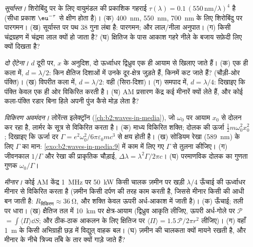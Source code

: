 \begin{exercise}[$\star\star$]\label{exo:b2:dipole-radiation:8}
\emph{सूर्यास्त।} शिरोबिंदु पर  के लिए वायुमंडल की
प्रकाशिक गहराई $\tau(\lambda) = 0.1\,(550\,\text{nm}/\lambda)^4$ है (सीधा
प्रकाश $\eu^{-\tau}$ से क्षीण होता है)। (क) \qty{400}{nm}, \qty{550}{nm}, \qty{700}{nm} के लिए
शिरोबिंदु पर पारगमन। (ख) सूर्यास्त पर पथ
$38$ गुना लंबा है: पारगमन; और लाल/नीला अनुपात। (ग) किसी चंद्रग्रहण में
चंद्रमा लाल क्यों हो जाता है? (घ) क्षितिज के पास आकाश गहरे नीले
के बजाय सफ़ेदी लिए क्यों दिखता है?
\end{exercise}

\begin{exercise}[$\star\star$]\label{exo:b2:dipole-radiation:9}
\emph{दो ऐंटेना।} $d$ दूरी पर, $x$ के अनुदिश, दो ऊर्ध्वाधर
द्विध्रुव एक ही आयाम से खिलाए जाते हैं। (क) एक ही कला में, $d = \lambda/2$: किन
क्षैतिज दिशाओं में उनके दूर-क्षेत्र जुड़ते हैं, किनमें कट जाते हैं?
(चौड़ी-ओर पंक्ति)। (ख) विपरीत कला में, $d = \lambda/2$: वही (सिरा-दिशा)।
(ग) समपाद में, $d = \lambda/4$: दिखाइए कि पंक्ति केवल एक ही
ओर विकिरित करती है। (घ) AM प्रसारण केंद्र कई मीनारें क्यों लेते हैं, और
कोई कला-पंक्ति रडार बिना हिले अपनी पुंज कैसे मोड़ लेता है?
\end{exercise}

\begin{exercise}[$\star\star\star$]\label{exo:b2:dipole-radiation:10}
\emph{विकिरण अवमंदन।} लोरेंत्स इलेक्ट्रॉन (\cref{ch:b2:waves-in-media}),
जो $\omega_0$ पर आयाम $x_0$ से दोलन कर रहा है, लार्मर के सूत्र से विकिरित करता है।
(क) माध्य विकिरित शक्ति; दोलक की ऊर्जा $\tfrac12m\omega_0^2x_0^2$;
दिखाइए कि ऊर्जा दर $\Gamma = e^2\omega_0^2/6\pi\varepsilon_0mc^3$ से क्षय होती है।
(ख) सोडियम रेखा (\qty{589}{nm}) के लिए $\Gamma$ का मान: \cref{exo:b2:waves-in-media:9}
में काम में लिए गए $\Gamma$ से तुलना कीजिए। (ग) जीवनकाल $1/\Gamma$ और रेखा की
प्राकृतिक चौड़ाई, $\Delta\lambda = \lambda^2\Gamma/2\pi c$। (घ) परमाणविक दोलक का गुणता गुणक
$\omega_0/\Gamma$।
\end{exercise}

\begin{exercise}[$\star\star\star$]\label{exo:b2:dipole-radiation:11}
\emph{मीनार।} कोई AM केंद्र \qty{1}{MHz} पर \qty{50}{kW} किसी चालक ज़मीन पर खड़ी
$\lambda/4$ ऊँचाई की ऊर्ध्वाधर मीनार से विकिरित करता है (ज़मीन किसी
दर्पण की तरह काम करती है, जिससे मीनार किसी  की आधी बन जाती है: $R_{\text{विकिरण}} \approx
\qty{36}{\ohm}$, और शक्ति केवल ऊपरी अर्ध-आकाश में जाती है)। (क)
ऊँचाई; तली पर धारा। (ख) क्षैतिज तल में \qty{10}{km} पर क्षेत्र-आयाम
(द्विध्रुव आकृति लीजिए, ऊपरी अर्ध-गोले पर $\mathcal P$
$= \int\langle\Pi\rangle\dd S$; और ठीक-ठाक आकलन के लिए क्षितिज पर $\langle\Pi\rangle = 1.5\,
\mathcal P/2\pi r^2$ लीजिए)। (ग) वहाँ \qty{1}{m} के किसी अभिग्राही छड़ में
विद्युत् वाहक बल। (घ) ज़मीन की चालकता क्यों मायने रखती है, और मीनार के नीचे
त्रिज्य ताँबे के तार क्यों गाड़े जाते हैं?
\end{exercise}

